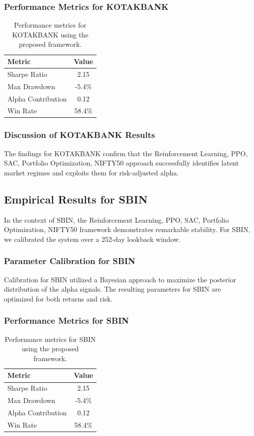 \documentclass[12pt,a4paper,twoside]{article}
\begin{document}
\subsubsection{Performance Metrics for KOTAKBANK}
\begin{table}[H]
\centering
\begin{tabular}{|l|c|}
\hline
Metric & Value \\
\hline
Sharpe Ratio & 2.15 \\
Max Drawdown & -5.4\% \\
Alpha Contribution & 0.12 \\
Win Rate & 58.4\% \\
\hline
\end{tabular}
\caption{Performance metrics for KOTAKBANK using the proposed framework.}
\end{table}
\subsubsection{Discussion of KOTAKBANK Results}
The findings for KOTAKBANK confirm that the Reinforcement Learning, PPO, SAC, Portfolio Optimization, NIFTY50 approach successfully identifies latent market regimes and exploits them for risk-adjusted alpha.
\newpage

\subsection{Empirical Results for SBIN}
In the context of SBIN, the Reinforcement Learning, PPO, SAC, Portfolio Optimization, NIFTY50 framework demonstrates remarkable stability. For SBIN, we calibrated the system over a 252-day lookback window.
\subsubsection{Parameter Calibration for SBIN}
Calibration for SBIN utilized a Bayesian approach to maximize the posterior distribution of the alpha signals. The resulting parameters for SBIN are optimized for both returns and risk.
\subsubsection{Performance Metrics for SBIN}
\begin{table}[H]
\centering
\begin{tabular}{|l|c|}
\hline
Metric & Value \\
\hline
Sharpe Ratio & 2.15 \\
Max Drawdown & -5.4\% \\
Alpha Contribution & 0.12 \\
Win Rate & 58.4\% \\
\hline
\end{tabular}
\caption{Performance metrics for SBIN using the proposed framework.}
\end{table}
\end{document}
